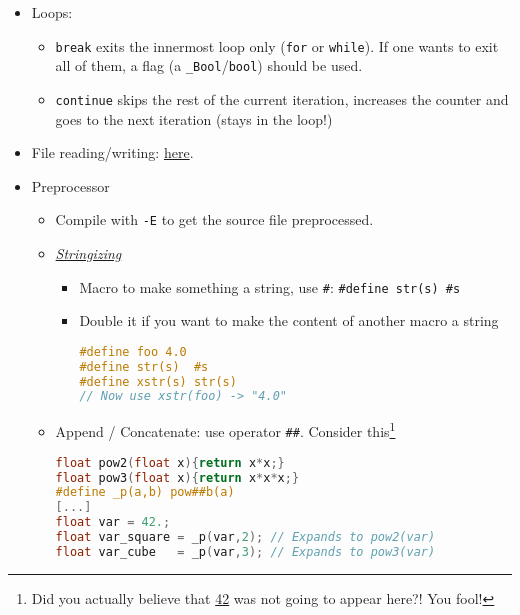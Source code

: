 \documentclass[a4paper,12pt,%
              final%
              ]{article}
\begin{document}
\begin{itemize}
\begin{itemize}
    \end{itemize}
  \item Loops:
    \begin{itemize}
      \item \texttt{break} exits the innermost loop only (\texttt{for} or \texttt{while}). If one wants to exit all of them, a flag (a \verb|_Bool|/\verb|bool|) should be used.
      \item \texttt{continue} skips the rest of the current iteration, increases the counter and goes to the next iteration (stays in the loop!)
    \end{itemize}
  \item File reading/writing: \href{https://www.programiz.com/c-programming/c-file-input-output}{here}.
  \item Preprocessor
    \begin{itemize}
      \item Compile with \verb|-E| to get the source file preprocessed.
      \item \href{https://gcc.gnu.org/onlinedocs/gcc-7.5.0/cpp/Stringizing.html}{\emph{Stringizing}}
        \begin{itemize}
          \item Macro to make something a string, use \verb|#|: \verb|#define str(s) #s|
          \item Double it if you want to make the content of another macro a string
\begin{lstlisting}[language=C]
#define foo 4.0
#define str(s)  #s
#define xstr(s) str(s)
// Now use xstr(foo) -> "4.0"
\end{lstlisting}
        \end{itemize}
      \item Append / Concatenate: use operator \verb|##|. Consider this\footnote{Did you actually believe that \href{https://hitchhikers.fandom.com/wiki/42}{42} was not going to appear here?! You fool!}
\begin{lstlisting}[language=C]
float pow2(float x){return x*x;}
float pow3(float x){return x*x*x;}
#define _p(a,b) pow##b(a)
[...]
float var = 42.;
float var_square = _p(var,2); // Expands to pow2(var)
float var_cube   = _p(var,3); // Expands to pow3(var)
\end{lstlisting}
    \end{itemize}
  \end{itemize}
\end{document}
